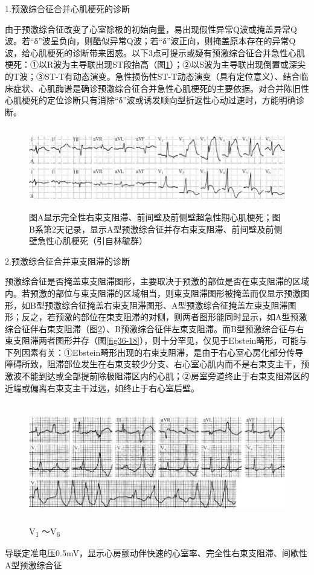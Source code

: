 1.预激综合征合并心肌梗死的诊断

由于预激综合征改变了心室除极的初始向量，易出现假性异常Q波或掩盖异常Q波。若“δ”波呈负向，则酷似异常Q波；若“δ”波正向，则掩盖原本存在的异常Q波，给心肌梗死的诊断带来困惑。以下3点可提示或疑有预激综合征合并急性心肌梗死：①以R波为主导联出现ST段抬高（图\ref{fig36-16}）；②以S波为主导联出现倒置或深尖的T波；③ST-T有动态演变。急性损伤性ST-T动态演变（具有定位意义）、结合临床症状、心肌酶谱是确诊预激综合征合并急性心肌梗死的主要依据。对合并陈旧性心肌梗死的定位诊断只有消除“δ”波或诱发顺向型折返性心动过速时，方能明确诊断。

\begin{figure}[!htbp]
 \centering
 \includegraphics[width=5.73958in,height=1.41667in]{./images/Image00588.jpg}
 \captionsetup{justification=centering}
 \caption{图A显示完全性右束支阻滞、前间壁及前侧壁超急性期心肌梗死；图B系第2天记录，显示A型预激综合征并存右束支阻滞、前间壁及前侧壁急性心肌梗死（引自林毓群）}
 \label{fig36-16}
  \end{figure} 

2.预激综合征合并束支阻滞的诊断

预激综合征是否掩盖束支阻滞图形，主要取决于预激的部位是否在束支阻滞的区域内。若预激的部位与束支阻滞的区域相当，则束支阻滞图形被掩盖而仅显示预激图形，如B型预激综合征掩盖右束支阻滞图形、A型预激综合征掩盖左束支阻滞图形；反之，若预激的部位在束支阻滞的对侧，则两者图形能同时显示，如A型预激综合征伴右束支阻滞（图\ref{fig36-17}）、B预激综合征伴左束支阻滞。而B型预激综合征与右束支阻滞两者图形并存（图\ref{fig36-18}），则十分罕见，仅见于Ebstein畸形，可能与下列因素有关：①Ebstein畸形出现的右束支阻滞，是由于右心室心房化部分传导障碍所致，阻滞部位发生在右束支较少分支、右心室心肌内而不是右束支主干，预激波不能到达或全部提前除极阻滞区内的心肌；②房室旁道终止于右束支阻滞区的近端或偏离右束支主干过远，如终止于右心室后壁。

\begin{figure}[!htbp]
 \centering
 \includegraphics[width=5.78125in,height=2.07292in]{./images/Image00589.jpg}
 \captionsetup{justification=centering}
 \caption{V\textsubscript{1} ～V\textsubscript{6}}
 \label{fig36-17}
  \end{figure} 
导联定准电压0.5mV，显示心房颤动伴快速的心室率、完全性右束支阻滞、间歇性A型预激综合征

